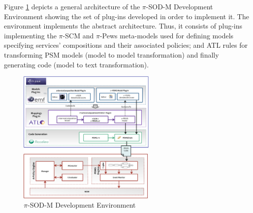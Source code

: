 Figure \ref{fig:policymanager} depicts a general architecture of the $\pi$-SOD-M Development Environment showing the set of plug-ins  developed in order to implement it. The environment implements the abstract architecture. Thus, it consists of plug-ins implementing the $\pi$-SCM and $\pi$-{\sc Pews} meta-models used for defining models specifying services' compositions and their associated policies; and ATL rules for transforming  PSM models (model to model transformation) and finally generating code (model to text transformation).
\begin{figure}[htpb]
	\begin{center}
		\includegraphics[width=0.60\textwidth]{figs/architecture}
	\end{center}
		\caption{$\pi$-SOD-M Development Environment}
   \label{fig:policymanager}
\end{figure}
